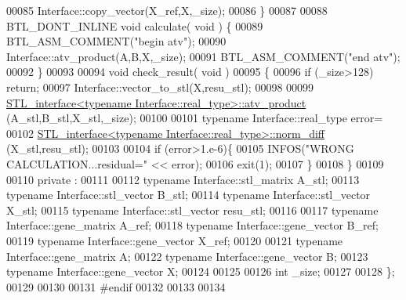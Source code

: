 \begin{DoxyCode}
00085     Interface::copy\_vector(X\_ref,X,\_size);
00086   \}
00087 
00088   BTL\_DONT\_INLINE \textcolor{keywordtype}{void} calculate( \textcolor{keywordtype}{void} ) \{
00089     BTL\_ASM\_COMMENT(\textcolor{stringliteral}{"begin atv"});
00090     Interface::atv\_product(A,B,X,\_size);
00091     BTL\_ASM\_COMMENT(\textcolor{stringliteral}{"end atv"});
00092   \}
00093 
00094   \textcolor{keywordtype}{void} check\_result( \textcolor{keywordtype}{void} )
00095   \{
00096     \textcolor{keywordflow}{if} (\_size>128) \textcolor{keywordflow}{return};
00097     Interface::vector\_to\_stl(X,resu\_stl);
00098 
00099     \hyperlink{class_s_t_l__interface}{STL\_interface<typename Interface::real\_type>::atv\_product}
      (A\_stl,B\_stl,X\_stl,\_size);
00100 
00101     \textcolor{keyword}{typename} Interface::real\_type error=
00102       \hyperlink{class_s_t_l__interface}{STL\_interface<typename Interface::real\_type>::norm\_diff}
      (X\_stl,resu\_stl);
00103 
00104     \textcolor{keywordflow}{if} (error>1.e-6)\{
00105       INFOS(\textcolor{stringliteral}{"WRONG CALCULATION...residual="} << error);
00106       exit(1);
00107     \}
00108   \}
00109 
00110 private :
00111 
00112   \textcolor{keyword}{typename} Interface::stl\_matrix A\_stl;
00113   \textcolor{keyword}{typename} Interface::stl\_vector B\_stl;
00114   \textcolor{keyword}{typename} Interface::stl\_vector X\_stl;
00115   \textcolor{keyword}{typename} Interface::stl\_vector resu\_stl;
00116 
00117   \textcolor{keyword}{typename} Interface::gene\_matrix A\_ref;
00118   \textcolor{keyword}{typename} Interface::gene\_vector B\_ref;
00119   \textcolor{keyword}{typename} Interface::gene\_vector X\_ref;
00120 
00121   \textcolor{keyword}{typename} Interface::gene\_matrix A;
00122   \textcolor{keyword}{typename} Interface::gene\_vector B;
00123   \textcolor{keyword}{typename} Interface::gene\_vector X;
00124 
00125 
00126   \textcolor{keywordtype}{int} \_size;
00127 
00128 \};
00129 
00130 
00131 \textcolor{preprocessor}{#endif}
00132 
00133 
00134 
\end{DoxyCode}
